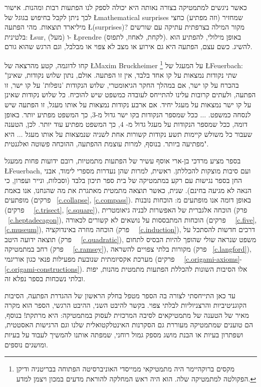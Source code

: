 כאשר ניגשים למתמטיקה בצורה נאותה היא יכולה לספק לנו הפתעות רבות ומהנות. אישור לכך ניתן לקבל בחיפוש בגוגל של 
\L{mathematical surprises}
שמחזיר (וזה מפתיע) כחצי מיליארד תוצאות. מהי הפתעה
\L{(surprises)}?
מקור המילה בצרפתית עתיקה עם שורשים בלטינית: 
\L{sur},
(מעל) ו-%
\L{prendre}
(לקחת, לאחוז, לתפוס). באופן מילולי, להפתיע הוא להשיג. כשם עצם, הפתעה היא גם אירוע או מצב לא צפוי או מבלבל, וגם הרגש שהוא גורם.


קחו לדוגמה, קטע מהרצאה של
\L{Maxim Bruckheimer}%
\footnote{מקסים ברוקהיימר היה מתמטיקאי ממייסדי האוניברסיטה הפתוחה בבריטניה ודיקן הפקולטה למתמטיקה שלה. 
הוא היה ראש המחלקה להוראת מדעים במכון ויצמן למדע.}
על המעגל של
\L{Feuerbach}:
"שתי נקודות נמצאות על קו אחד בלבד, אין זו הפתעה. אולם, נתון שלוש נקודות, שאינן בהכרח על קו ישר, אם במהלך החקר הגיאומטרי, שלוש הנקודות 'נופלות' על קו ישר, זו הפתעה, ולעתים קרובות עלינו להתייחס לעובדה כמשפט שיש להוכיח. כל שלוש נקודות שאינן על קו ישר נמצאות על מעגל יחיד. אם ארבע נקודות נמצאות על אותו מעגל, זו הפתעה שיש לנסחה כמשפט.
$\ldots$
ככל שמספר הנקודות בקו ישר גדול מ-$3$, כך המשפט מפתיע יותר. באופן דומה, ככל שמספר הנקודות על מעגל גדול מ-%
$4$,
כך המשפט מפתיע עוד יותר. לכן, הטענה שעבור כל משולש קיימות תשע נקודות קשורות אחת לשניה שנמצאות על אותו מעגל  
$\ldots$
היא מפתיעה ביותר. בנוסף, למרות עוצמת ההפתעה, ההוכחה פשוטה ואלגנטית".

בספר מציע מרדכי בן-ארי אוסף עשיר של הפתעות מתמטיות, רובם ידועות פחות ממעגל 
\L{Feuerbach},
ועם סיבות מוצקות להכללתן. ראשית, למרות שהן נעדרות מספרי לימוד, אבני החן בספר נגישות עם רקע במתמטיקה של בית ספר תיכון בלבד (וסבלות, ונייר ועפרון, כי הנאה לא מגיעה בחינם). שנית, כאשר תוצאה מתמטית מאתגרת את מה שהנחנו, אנו באמת מופתעים (פרקים~%
\ref{c.collapse}, \ref{c.compass}).
באופן דומה אנו מופתעים מ: הוכחות נובנות (פרקים~%
~\ref{c.trisect}, \ref{c.square}),
הוכחה אלגברית של האפשרות לבניה גיאומטרית (פרק~%
~\ref{c.heptadecagon}),
הוכחות המתבססות על נושאים לא קשורים לכאורה (פרקים~%
~\ref{c.five}, \ref{c.museum}),
הוכחה מוזרה באינדוקציה (פרק~%
~\ref{c.induction}),
דרכים חדשות להסתכל על תוצאה ידועה היטב (פרק~%
~\ref{c.quadratic}),
משפט שנראה שולי שהופך להיות הבסיס לתחום רחב במתמטיקה (פרק~%
~\ref{c.ramsey}),
מקורות בלתי צפויים להשראה (פרק~%
\ref{c.langford}),
מערכת אקסיומתית שנובעת מפעילות פנאי כגון אוריגמי (פרקים~%
~\ref{c.origami-axioms}-\ref{c.origami-constructions}).
אלו הסיבות השונות להכללת הפתעות מתמטית מהנות, יפות ובלתי נשכחות בספר נפלא זה.

עד כאן התייחסתי לצורה בה הספר מטפל בחלק הראשון של ההגדרת הפתעה, הסיבות הקוגניטיביות והרצניוליות לבלתי צפוי. בקשר להיבט השני, ההיבט הרגשי, הספר הוא מקרה מאיר של הטענה של מתמטיקאים לסיבה המרכזית לעסוק במתמטיקה: היא מרתקת! בנוסף, הם טוענים שמתמטיקה מעוררת גם הסקרנות האינטלקטואלית שלנו וגם הרגישות האסטטית, ושפתרון בעיות או הבנת מושג מספק גמול רוחני, שמפתה אותנו להמשיך לעבוד על בעיות ומושגים נוספים.

